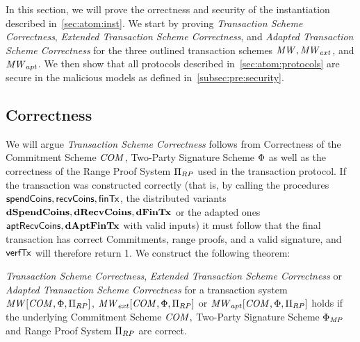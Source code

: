 In this section, we will prove the orrectness and security of the instantiation described in~\cref{sec:atom:inst}.
We start by proving \emph{Transaction Scheme Correctness}, \emph{Extended Transaction Scheme Correctness}, and \emph{Adapted Transaction Scheme Correctness} for the three outlined transaction schemes $\mathit{MW}, \mathit{MW}_{ext}$, and $\mathit{MW}_{apt}$.
We then show that all protocols described in~\cref{sec:atom:protocols} are secure in the malicious models as defined in~\cref{subsec:pre:security}.

\subsection{Correctness} \label{subsec:atom:correctness}

We will argue \emph{Transaction Scheme Correctness} follows from Correctness of the Commitment Scheme $\mathit{COM}$, Two-Party Signature Scheme $\Phi$ as well as the correctness of the Range Proof System $\Pi_{RP}$ used in the transaction protocol.
If the transaction was constructed correctly (that is, by calling the procedures $\mathsf{spendCoins}, \mathsf{recvCoins}, \mathsf{finTx}$, the distributed variants $\mathbf{dSpendCoins}, \mathbf{dRecvCoins}, \mathbf{dFinTx}$ or the adapted ones $\mathsf{aptRecvCoins}, \mathbf{dAptFinTx}$ with valid inputs) it must follow that the final transaction has correct Commitments, range proofs, and a valid signature, and $\mathsf{verfTx}$ will therefore return 1.
We construct the following theorem:

\begin{theorem}
    \label{lem:atom:correctness}
    \emph{Transaction Scheme Correctness}, \emph{Extended Transaction Scheme Correctness} or \emph{Adapted Transaction Scheme Correctness} for a transaction system $\mathit{MW}[\mathit{COM},\Phi,\Pi_{RP}]$, $\mathit{MW}_{ext}[\mathit{COM},\Phi,\Pi_{RP}]$ or $\mathit{MW}_{apt}[\mathit{COM},\Phi,\Pi_{RP}]$ holds if the underlying Commitment Scheme $\mathit{COM},$ Two-Party Signature Scheme $\Phi_{\mathit{MP}}$ and Range Proof System $\Pi_{RP}$ are correct.
\end{theorem}

